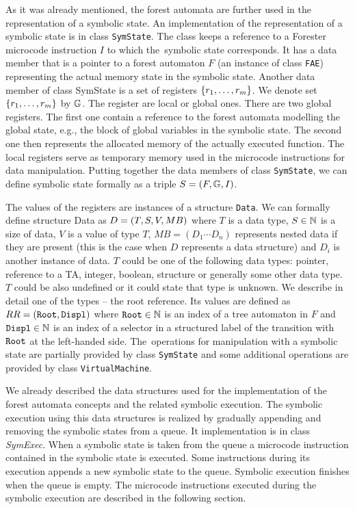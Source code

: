 As it was already mentioned, the forest automata are further used in the representation of a symbolic state.
An implementation of the representation of a symbolic state is in class {\tt SymState}.
The class keeps a reference to a Forester microcode instruction $I$ to which the~symbolic state corresponds.
It has a data member that is a pointer to a forest automaton $F$ (an instance of class {\tt FAE})
representing the actual memory state in the symbolic state.
Another data member of class SymState is a set of registers $\{r_1, \ldots, r_m\}$.
We denote set $\{r_1, \ldots, r_m\}$ by $\mathbb{G}$. 
The register are local or global ones.
There are two global registers.
The first one contain a reference to the forest automata modelling
the global state, e.g., the block of global variables in the symbolic state.
The second one then represents the allocated memory of the actually executed function.
The local registers serve as temporary memory used in
the microcode instructions for data manipulation.
Putting together the data members of class {\tt SymState},
we can define symbolic state formally as a triple $S=(F, \mathbb{G}, I)$.

The values of the registers are instances of a structure {\tt Data}.
We can formally define structure Data as $D = (T,S,V,MB)$ where
$T$ is a data type,
$S \in \mathbb{N}$ is a size of data,
$V$ is a value of type $T$,
$MB=(D_1 \cdots D_n)$ represents nested data if they are present (this is the case when $D$ represents a data structure)
and $D_i$ is another instance of data.
$T$ could be one of the following data types: pointer, reference to a TA, integer, boolean,
structure or generally some other data type.
$T$ could be also undefined or it could state that type is unknown.
We describe in detail one of the types -- the root reference.
Its values are defined as $RR=({\tt Root},{\tt Displ})$
where ${\tt Root} \in \mathbb{N}$ is an index of a tree automaton in $F$
and ${\tt Displ} \in \mathbb{N}$ is an index of a selector in a structured label of
the transition with ${\tt Root}$ at the left-handed side.
The~operations for manipulation with a symbolic state are partially provided by class {\tt SymState}
and some additional operations are provided by class {\tt VirtualMachine}.

We already described the data structures used for the implementation of the forest automata concepts
and the related symbolic execution.
The symbolic execution using this data structures is realized by gradually appending
and removing the symbolic states from a queue.
It implementation is in class \emph{SymExec}.
When a symbolic state is taken from the queue a microcode instruction contained in
the symbolic state is executed.
Some instructions during its execution appends a new symbolic state to the queue.
Symbolic execution finishes when the queue is empty.
The microcode instructions executed during the symbolic execution are described in the following section.

